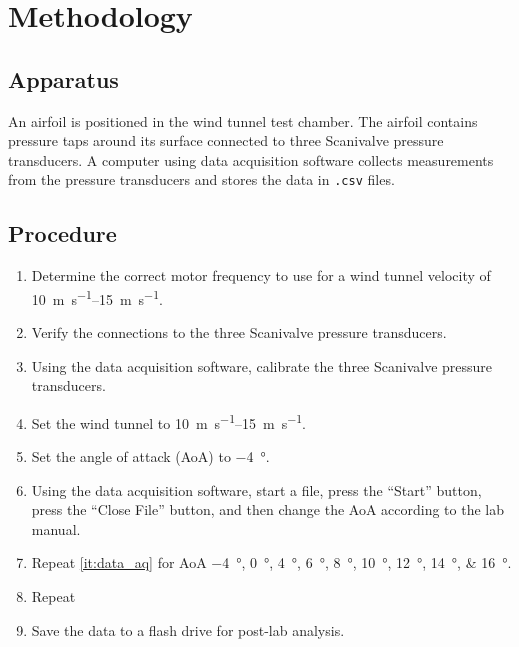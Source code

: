 \chapter{Methodology}
\label{cp:methodology}

\section{Apparatus}\label{sec:apparatus}
An airfoil is positioned in the wind tunnel test chamber. The airfoil contains pressure taps around its surface connected to three Scanivalve pressure transducers. A computer using data acquisition software collects measurements from the pressure transducers and stores the data in \verb|.csv| files.

\section{Procedure}\label{sec:procedures}

\begin{enumerate}
    \item Determine the correct motor frequency to use for a wind tunnel velocity of \qtyrange{10}{15}{\meter\per\second}.
    \item Verify the connections to the three Scanivalve pressure transducers.
    \item Using the data acquisition software, calibrate the three Scanivalve pressure transducers.
    \item Set the wind tunnel to \qtyrange{10}{15}{\meter\per\second}.
    \item Set the angle of attack (AoA) to \qty{-4}{\degree}.
    \item Using the data acquisition software, start a file, press the ``Start'' button, press the ``Close File'' button, and then change the AoA according to the lab manual. \label{it:data_aq}
    \item Repeat \autoref{it:data_aq} for AoA \qtylist{-4;0;4;6;8;10;12;14;16}{\degree}. \label{it:repeat}
    \item Repeat %
    \item Save the data to a flash drive for post-lab analysis.
\end{enumerate}